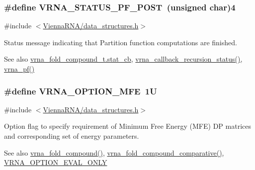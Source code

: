 \subsubsection[{V\+R\+N\+A\+\_\+\+S\+T\+A\+T\+U\+S\+\_\+\+P\+F\+\_\+\+P\+O\+S\+T}]{\setlength{\rightskip}{0pt plus 5cm}\#define V\+R\+N\+A\+\_\+\+S\+T\+A\+T\+U\+S\+\_\+\+P\+F\+\_\+\+P\+O\+S\+T~(unsigned char)4}\label{group__fold__compound_ga1c6fa243533fd026e50f7d595eaaa565}


{\ttfamily \#include $<$\hyperlink{data__structures_8h}{Vienna\+R\+N\+A/data\+\_\+structures.\+h}$>$}



Status message indicating that Partition function computations are finished. 

\begin{DoxySeeAlso}{See also}
\hyperlink{group__fold__compound_a87a83f6795b569000efcbe65acc3dd81}{vrna\+\_\+fold\+\_\+compound\+\_\+t.\+stat\+\_\+cb}, \hyperlink{group__fold__compound_ga4a4a0d838de6d18315bafc84f93f5cc0}{vrna\+\_\+callback\+\_\+recursion\+\_\+status()}, \hyperlink{group__pf__fold_ga29e256d688ad221b78d37f427e0e99bc}{vrna\+\_\+pf()} 
\end{DoxySeeAlso}
\hypertarget{group__fold__compound_gae63be9127fe7dcc1f9bb14f5bb1064ee}{}
\subsubsection[{V\+R\+N\+A\+\_\+\+O\+P\+T\+I\+O\+N\+\_\+\+M\+F\+E}]{\setlength{\rightskip}{0pt plus 5cm}\#define V\+R\+N\+A\+\_\+\+O\+P\+T\+I\+O\+N\+\_\+\+M\+F\+E~1\+U}\label{group__fold__compound_gae63be9127fe7dcc1f9bb14f5bb1064ee}


{\ttfamily \#include $<$\hyperlink{data__structures_8h}{Vienna\+R\+N\+A/data\+\_\+structures.\+h}$>$}



Option flag to specify requirement of Minimum Free Energy (M\+F\+E) D\+P matrices and corresponding set of energy parameters. 

\begin{DoxySeeAlso}{See also}
\hyperlink{group__fold__compound_ga6601d994ba32b11511b36f68b08403be}{vrna\+\_\+fold\+\_\+compound()}, \hyperlink{group__fold__compound_gad6bacc816af274922b13d947f708aa0c}{vrna\+\_\+fold\+\_\+compound\+\_\+comparative()}, \hyperlink{group__fold__compound_ga61469c423131552c8483229f8b6c7e0e}{V\+R\+N\+A\+\_\+\+O\+P\+T\+I\+O\+N\+\_\+\+E\+V\+A\+L\+\_\+\+O\+N\+L\+Y} 
\end{DoxySeeAlso}
\hypertarget{group__fold__compound_gabfbadcddda3e74ce7f49035ef8f058f7}{}
